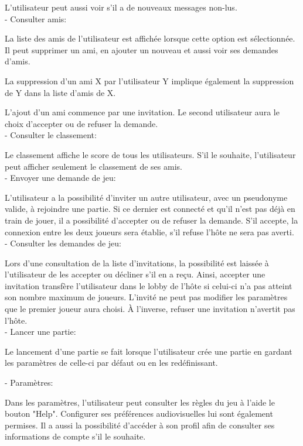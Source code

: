 \documentclass[a4paper,12pt]{article}
\begin{document}
L'utilisateur peut aussi voir s'il a de nouveaux messages non-lus.\\

- Consulter amis:

La liste des amis de l'utilisateur est affichée lorsque cette option est sélectionnée. Il peut supprimer un ami, en ajouter un nouveau et aussi voir ses demandes d'amis. 

La suppression d'un ami X par l'utilisateur Y implique également la suppression de Y dans la liste d'amis de X. 

L'ajout d'un ami commence par une invitation. Le second utilisateur aura le choix d'accepter ou de refuser la demande. \\

- Consulter le classement:

Le classement affiche le score de tous les utilisateurs. S'il le souhaite, l'utilisateur peut afficher seulement le classement de ses amis. \\

- Envoyer une demande de jeu:

L’utilisateur a la possibilité d’inviter un autre utilisateur, avec un pseudonyme valide, à rejoindre une partie. Si ce dernier est connecté et qu’il n’est pas déjà en train de jouer, il a possibilité d’accepter ou de refuser la demande. S’il accepte, la connexion entre les deux joueurs sera établie, s’il refuse l’hôte ne sera pas averti. \\

- Consulter les demandes de jeu:

Lors d’une consultation de la liste d’invitations, la possibilité est laissée à l’utilisateur de les accepter ou décliner s'il en a reçu. Ainsi, accepter une invitation transfère l’utilisateur dans le lobby de l’hôte si celui-ci n’a pas atteint son nombre maximum de joueurs. L’invité ne peut pas modifier les paramètres que le premier joueur aura choisi. À l’inverse, refuser une invitation n’avertit pas l’hôte. \\

- Lancer une partie:

Le lancement d’une partie se fait lorsque l’utilisateur crée une partie en gardant les paramètres de celle-ci par défaut ou en les redéfinissant.

- Paramètres:

Dans les paramètres, l'utilisateur peut consulter les règles du jeu à l'aide le bouton "Help". Configurer ses préférences audiovisuelles lui sont également permises. Il a aussi la possibilité d'accéder à son profil afin de consulter ses informations de compte s'il le souhaite.
\end{document}
